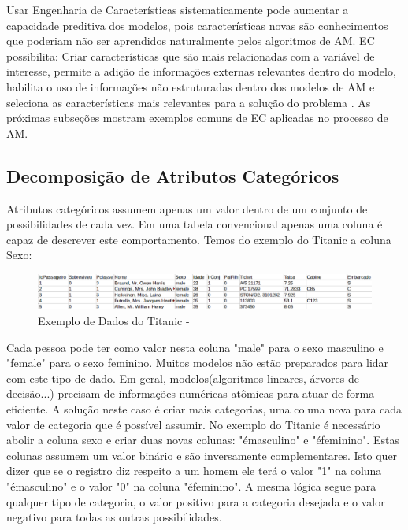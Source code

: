 Usar Engenharia de Características sistematicamente pode aumentar a capacidade preditiva dos modelos, pois características novas são conhecimentos que poderiam não ser aprendidos naturalmente pelos algoritmos de AM. EC possibilita: Criar características que são mais relacionadas com a variável de interesse, permite a adição de informações externas relevantes dentro do modelo, habilita o uso de informações não estruturadas dentro dos modelos de AM e seleciona as características mais relevantes para a solução do problema \cite{real2013}. As próximas subseções mostram exemplos comuns de EC aplicadas no processo de AM.

\subsection{Decomposição de Atributos Categóricos}
Atributos categóricos assumem apenas um valor dentro de um conjunto de possibilidades de cada vez. Em uma tabela convencional apenas uma coluna é capaz de descrever este comportamento. Temos do exemplo do Titanic a coluna Sexo: 

\begin{figure}[!h]
\centering
\includegraphics[keepaspectratio=true,scale=0.40]
{figuras/dataEg.eps}
\caption{Exemplo de Dados do Titanic - \cite{titanic2012}}
\label{data_titatic}
\end{figure}

Cada pessoa pode ter como valor nesta coluna "male" para o sexo masculino e "female" para o sexo feminino. Muitos modelos não estão preparados para lidar com este tipo de dado. Em geral, modelos(algoritmos lineares, árvores de decisão...) precisam de informações numéricas atômicas para atuar de forma eficiente. A solução neste caso é criar mais categorias, uma coluna nova para cada valor de categoria que é possível assumir. No exemplo do Titanic é necessário abolir a coluna sexo e criar duas novas colunas: "émasculino" e "éfeminino". Estas colunas assumem um valor binário e são inversamente complementares. Isto quer dizer que se o registro diz respeito a um homem ele terá o valor "1" na coluna "émasculino" e o valor "0" na coluna "éfeminino". A mesma lógica segue para qualquer tipo de categoria, o valor positivo para a categoria desejada e o valor negativo para todas as outras possibilidades.

